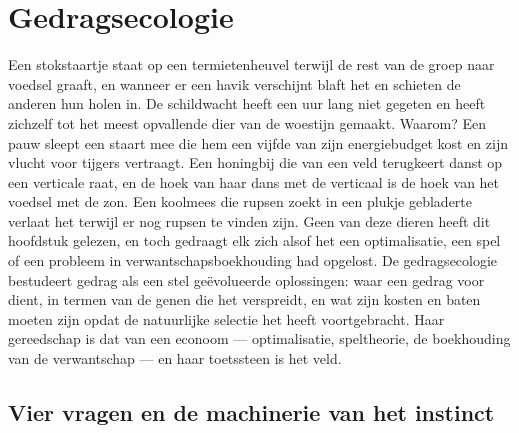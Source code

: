 \chapter{Gedragsecologie}\label{ch:b3:behavioural-ecology}

Een stokstaartje staat op een termietenheuvel terwijl de rest van de
groep naar voedsel graaft, en wanneer er een havik verschijnt blaft het
en schieten de anderen hun holen in. De schildwacht heeft een uur lang
niet gegeten en heeft zichzelf tot het meest opvallende dier van de
woestijn gemaakt. Waarom? Een pauw sleept een staart mee die hem een
vijfde van zijn energiebudget kost en zijn vlucht voor tijgers
vertraagt. Een honingbij die van een veld terugkeert danst op een
verticale raat, en de hoek van haar dans met de verticaal is de hoek van
het voedsel met de zon. Een koolmees die rupsen zoekt in een plukje
gebladerte verlaat het terwijl er nog rupsen te vinden zijn. Geen van
deze dieren heeft dit hoofdstuk gelezen, en toch gedraagt elk zich
alsof het een optimalisatie, een spel of een probleem in
verwantschapsboekhouding had opgelost. De gedragsecologie bestudeert
gedrag als een stel geëvolueerde oplossingen: waar een gedrag voor
dient, in termen van de genen die het verspreidt, en wat zijn kosten en
baten moeten zijn opdat de natuurlijke selectie het heeft
voortgebracht. Haar gereedschap is dat van een econoom ---
optimalisatie, speltheorie, de boekhouding van de verwantschap --- en
haar toetssteen is het veld.

\section{Vier vragen en de machinerie van het instinct}

